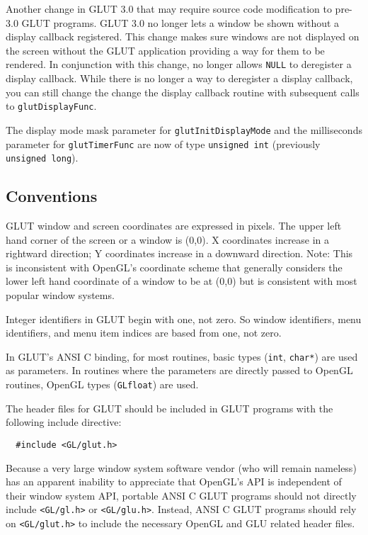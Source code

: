 \documentclass[titlepage,twoside]{article}
\begin{document}
Another change in GLUT 3.0 that may require source code
modification to pre-3.0 GLUT programs.  GLUT 3.0 no longer lets a
window be shown without a display callback registered.  This change
makes sure windows are not displayed on the screen without the GLUT
application providing a way for them to be rendered.  In conjunction
with this change,  no longer allows {\tt NULL}
to deregister a display callback.  While there is no longer a way to deregister
a display callback, you can still change the change the display
callback routine with subsequent calls to {\tt glutDisplayFunc}.

The display mode mask parameter for {\tt glutInitDisplayMode} and the
milliseconds parameter for {\tt glutTimerFunc} are now
of type {\tt unsigned int} (previously {\tt unsigned long}).

\subsection{Conventions}

GLUT window and screen coordinates are expressed in pixels.  The upper left hand
corner of the screen or a window is (0,0).  X coordinates increase in a
rightward direction; Y coordinates increase in a downward direction.
Note:  This is inconsistent with OpenGL's coordinate scheme that generally
considers the lower left hand coordinate of a window to be at (0,0) but is
consistent with most popular window systems.

Integer identifiers in GLUT begin with one, not zero.  So window identifiers,
menu identifiers, and menu item indices are based from one, not zero.

In GLUT's ANSI C binding, for most routines, basic types ({\tt int},
{\tt char*}) are used as parameters.  In routines where the parameters
are directly passed to OpenGL routines, OpenGL types ({\tt GLfloat})
are used.

The header files for GLUT should be included in GLUT programs
with the following include directive:
\begin{verbatim}
  #include <GL/glut.h>
\end{verbatim}
Because a very large window system software vendor (who will remain
nameless) has an apparent inability to appreciate that OpenGL's API is
independent of their window system API, portable ANSI C GLUT programs should
not directly include {\tt <GL/gl.h>} or {\tt <GL/glu.h>}.  Instead,
ANSI C GLUT programs should rely on {\tt <GL/glut.h>} to include the necessary
OpenGL and GLU related header files.
\end{document}

